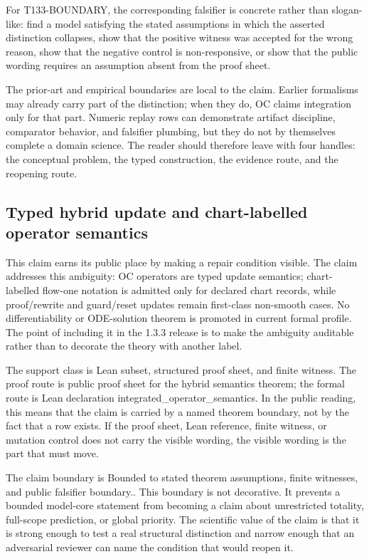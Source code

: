 For T133-BOUNDARY, the corresponding falsifier is concrete rather than slogan-like: find a model satisfying the stated assumptions in which the asserted distinction collapses, show that the positive witness was accepted for the wrong reason, show that the negative control is non-responsive, or show that the public wording requires an assumption absent from the proof sheet.

The prior-art and empirical boundaries are local to the claim. Earlier formalisms may already carry part of the distinction; when they do, OC claims integration only for that part. Numeric replay rows can demonstrate artifact discipline, comparator behavior, and falsifier plumbing, but they do not by themselves complete a domain science. The reader should therefore leave with four handles: the conceptual problem, the typed construction, the evidence route, and the reopening route.

\subsection{Typed hybrid update and chart-labelled operator semantics}
This claim earns its public place by making a repair condition visible. The claim addresses this ambiguity: OC operators are typed update semantics; chart-labelled flow-one notation is admitted only for declared chart records, while proof/rewrite and guard/reset updates remain first-class non-smooth cases. No differentiability or ODE-solution theorem is promoted in current formal profile. The point of including it in the 1.3.3 release is to make the ambiguity auditable rather than to decorate the theory with another label.

The support class is Lean subset, structured proof sheet, and finite witness. The proof route is public proof sheet for the hybrid semantics theorem; the formal route is Lean declaration integrated\_operator\_semantics. In the public reading, this means that the claim is carried by a named theorem boundary, not by the fact that a row exists. If the proof sheet, Lean reference, finite witness, or mutation control does not carry the visible wording, the visible wording is the part that must move.

The claim boundary is Bounded to stated theorem assumptions, finite witnesses, and public falsifier boundary.. This boundary is not decorative. It prevents a bounded model-core statement from becoming a claim about unrestricted totality, full-scope prediction, or global priority. The scientific value of the claim is that it is strong enough to test a real structural distinction and narrow enough that an adversarial reviewer can name the condition that would reopen it.

